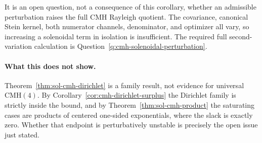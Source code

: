 \documentclass[../main.tex]{subfiles}
\begin{document}
\begin{remark}
It is an open question, not a consequence of this corollary, whether an admissible perturbation
raises the full CMH Rayleigh quotient. The covariance, canonical Stein kernel, both numerator
channels, denominator, and optimizer all vary, so increasing a solenoidal term in isolation is
insufficient. The required full second-variation calculation is
Question~\ref{q:cmh-solenoidal-perturbation}.
\end{remark}

\paragraph{What this does not show.}
Theorem~\ref{thm:sol-cmh-dirichlet} is a family result, not evidence for universal
$\mathrm{CMH}(4)$. By Corollary~\ref{cor:cmh-dirichlet-surplus} the Dirichlet family is
strictly inside the bound, and by Theorem~\ref{thm:sol-cmh-product} the saturating cases are
products of centered one-sided exponentials, where the slack is exactly zero. Whether that
endpoint is perturbatively unstable is precisely the open issue just stated.
\end{document}
